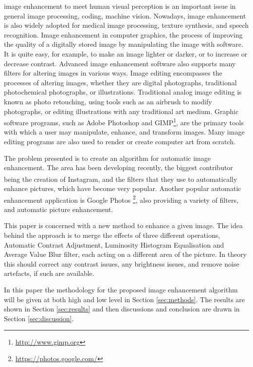 \documentclass[journal,transmag]{IEEEtran}
\begin{document}
 image enhancement to meet human visual perception is an important issue in general image processing, coding, machine vision. Nowadays, image enhancement is also widely adopted for medical image processing, texture synthesis, and speech recognition\cite{introQuote}. Image enhancement in computer graphics, the process of improving the quality of a digitally stored image by manipulating the image with software. It is quite easy, for example, to make an image lighter or darker, or to increase or decrease contrast. Advanced image enhancement software also supports many filters for altering images in various ways\cite{quoteImageEnhancement}.
Image editing encompasses the processes of altering images, whether they are digital photographs, traditional photochemical photographs, or illustrations. Traditional analog image editing is known as photo retouching, using tools such as an airbrush to modify photographs, or editing illustrations with any traditional art medium. Graphic software programs, such as Adobe\textsuperscript{\texttrademark} Photoshop\textsuperscript{\textregistered} and GIMP\footnote{\url{http://www.gimp.org}}, are the primary tools with which a user may manipulate, enhance, and transform images. Many image editing programs are also used to render or create computer art from scratch.\

The problem presented is to create an algorithm for automatic image enhancement. The area has been developing recently, the biggest contributor being the creation of Instagram\textsuperscript{\texttrademark}, and the filters that they use to automatically enhance pictures, which have become very popular. Another popular automatic enhancement application is Google Photos \footnote{\url{https://photos.google.com/}}, also providing a variety of filters, and automatic picture enhancement. 

This paper is concerned with a new method to enhance a given image. The idea behind the approach is to merge the effects of three different operations, Automatic Contrast Adjustment, Luminosity Histogram Equalisation and Average Value Blur filter, each acting on a different area of the picture. In theory this should correct any contrast issues, any brightness issues, and remove noise artefacts, if such are available.

In this paper the methodology for the proposed image enhancement algorithm will be given at both high and low level in Section \ref{sec:methods}. The results are shown in Section \ref{sec:results} and then discussions and conclusion are drawn in Section \ref{sec:discussion}.
\end{document}
